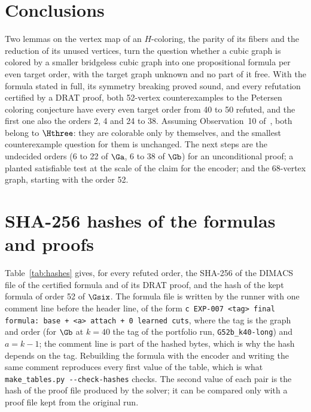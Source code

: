 \section{Conclusions}\label{sec:conclusions}

Two lemmas on the vertex map of an $H$-coloring, the parity of its fibers and the reduction of its unused vertices, turn the question whether a cubic graph is colored by a smaller bridgeless cubic graph into one propositional formula per even target order, with the target graph unknown and no part of it free.
With the formula stated in full, its symmetry breaking proved sound, and every refutation certified by a DRAT proof, both 52-vertex counterexamples to the Petersen coloring conjecture have every even target order from 40 to 50 refuted, and the first one also the orders 2, 4 and 24 to 38. Assuming Observation~10 of~\cite{GJMMMU2026}, both belong to $\Hthree$: they are colorable only by themselves, and
the smallest counterexample question for them is unchanged. The next steps are the undecided orders (6 to 22 of $\Ga$, 6 to 38 of $\Gb$) for an unconditional proof; a planted satisfiable test at the scale of the claim for the encoder; and the 68-vertex graph, starting with the order 52.

\appendix

\section{SHA-256 hashes of the formulas and proofs}\label{app:hashes}

Table~\ref{tab:hashes} gives, for every refuted order, the SHA-256 of the DIMACS file of the certified formula and of its DRAT proof, and the hash of the kept formula of order 52 of $\Gsix$. The formula file is written by the runner with one comment line before the header line, of the form \texttt{c EXP-007 <tag> final formula: base + <a> attach + 0 learned cuts}, where the tag
is the graph and order (for $\Gb$ at $k = 40$ the tag of the portfolio run, \texttt{G52b\_k40-long}) and $a = k - 1$; the comment line is part of the hashed bytes, which is why the hash depends on the tag. Rebuilding the formula with the encoder and writing the same comment reproduces every first value of the table, which is what \texttt{make\_tables.py -{}-check-hashes} checks. The second
value of each pair is the hash of the proof file produced by the solver; it can be compared only with a proof file kept from the original run.


